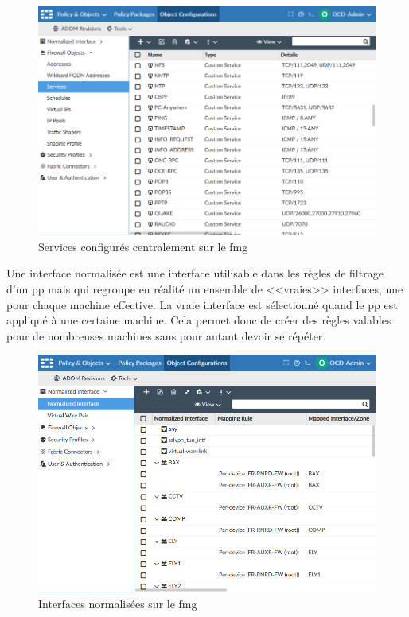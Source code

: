 \documentclass[12pt, oneside, a4paper, titlepage]{report}
\begin{document}
\begin{figure}[h!]
    \centering
    \includegraphics[width = \linewidth]{img/fmg/services.png}
    \caption{Services configurés centralement sur le \acrlong{fmg}}%
    \label{fig:fmg/services}
\end{figure}

Une interface normalisée est une interface utilisable dans les règles de
filtrage d'un \gls{pp} mais qui regroupe en réalité un ensemble de <<vraies>>
interfaces, une pour chaque machine effective.  La vraie interface est
sélectionné quand le \gls{pp} est appliqué à une certaine machine. Cela permet
donc de créer des règles valables pour de nombreuses machines sans pour autant
devoir se répéter.

\begin{figure}[h!]
    \centering
    \includegraphics[width = \linewidth]{img/fmg/interfaces.png}
    \caption{Interfaces normalisées sur le \acrlong{fmg}}%
    \label{fig:fmg/interfaces}
\end{figure}
\end{document}
